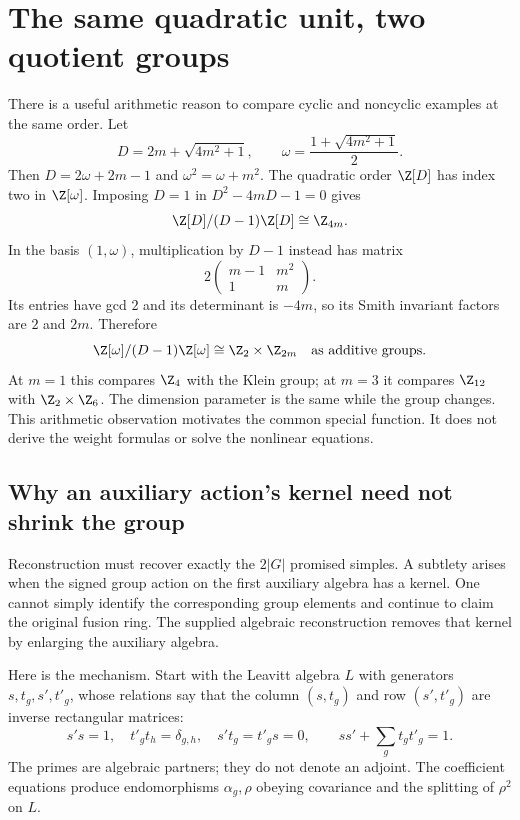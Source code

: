 \section{The same quadratic unit, two quotient groups}

There is a useful arithmetic reason to compare cyclic and noncyclic
examples at the same order. Let
\[
 D=2m+\sqrt{4m^2+1},\qquad
 \omega=\frac{1+\sqrt{4m^2+1}}2.
\]
Then $D=2\omega+2m-1$ and $\omega^2=\omega+m^2$.
The quadratic order $\Z[D]$ has index two in $\Z[\omega]$.
Imposing $D=1$ in $D^2-4mD-1=0$ gives
\[
 \Z[D]/(D-1)\Z[D]\cong\Z_{4m}.
\]
In the basis $(1,\omega)$, multiplication by $D-1$ instead has matrix
\[
 2\begin{pmatrix}m-1&m^2\\1&m\end{pmatrix}.
\]
Its entries have gcd $2$ and its determinant is $-4m$, so its
Smith invariant factors are $2$ and $2m$. Therefore
\begin{equation}
 \Z[\omega]/(D-1)\Z[\omega]
 \cong\Z_2\times\Z_{2m}
 \quad\hbox{as additive groups}.
 \label{eq:noncyclic-orders}
\end{equation}
At $m=1$ this compares $\Z_4$ with the Klein group; at $m=3$
it compares $\Z_{12}$ with $\Z_2\times\Z_6$. The dimension
parameter is the same while the group changes. This arithmetic
observation motivates the common special function. It does not
derive the weight formulas or solve the nonlinear equations.

\subsection{Why an auxiliary action's kernel need not shrink the group}

Reconstruction must recover exactly the $2|G|$ promised simples.
A subtlety arises when the signed group action on the first
auxiliary algebra has a kernel. One cannot simply identify the
corresponding group elements and continue to claim the original
fusion ring. The supplied algebraic reconstruction removes that
kernel by enlarging the auxiliary algebra.

Here is the mechanism. Start with the Leavitt algebra $L$ with
generators $s,t_g,s',t'_g$, whose relations say that the column
$(s,t_g)$ and row $(s',t'_g)$ are inverse rectangular matrices:
\[
 s's=1,\quad t'_gt_h=\delta_{g,h},\quad
 s't_g=t'_gs=0,\qquad ss'+\sum_gt_gt'_g=1.
\]
The primes are algebraic partners; they do not denote an adjoint.
The coefficient equations produce endomorphisms $\alpha_g,\rho$
obeying covariance and the splitting of $\rho^2$ on $L$.

